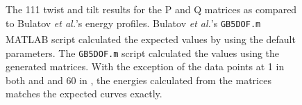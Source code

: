 \documentclass[twoside,senior]{BYUPhys}
\begin{document}
\begin{figure}[ht!]
 \centering
 
 \quad
 \caption[A comparison of the \textlangle{}111\textrangle{} copper curves with the calculated results.]{\label{appfig:compare111} The \textlangle{}111\textrangle{} twist \protect{} and tilt \protect{} results for the P and Q matrices as compared to Bulatov \emph{et al.}'s energy profiles. Bulatov \emph{et al.}'s \lstinline!GB5DOF.m! MATLAB\textsuperscript{\textregistered} script calculated the expected values by using the default parameters. The \lstinline!GB5DOF.m! script calculated the values using the generated matrices. With the exception of the data points at 1\textdegree{} in both \protect{} and \protect{} and 60\textdegree{} in \protect{}, the energies calculated from the matrices matches the expected curves exactly.}
\end{figure}
\end{document}
